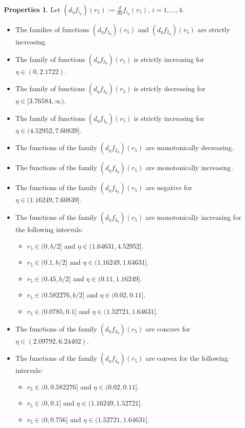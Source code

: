 \documentclass[final,11pt]{article}
\numberwithin{equation}{section}
\theoremstyle{definition}
\newtheorem{properties}[theorem]{Properties}
\begin{document}
\begin{properties}\label{dfs}
Let $\left(d_{\eta}f_{i_\eta}\right)(r_5):=\frac{d}{d\eta}f_{i_\eta}(r_5)$, $i=1,...,4$.
\begin{itemize}
\item The families of functions $\left(d_{\eta}f_{1_\eta}\right)(r_5)$ and $\left(d_{\eta}f_{2_\eta}\right)(r_5)$ are strictly increasing.
\item The family of functions $\left(d_{\eta}f_{3_\eta}\right)(r_5)$ is strictly increasing for $\eta\in(0,2.1722)$.
\item The family of functions $\left(d_{\eta}f_{3_\eta}\right)(r_5)$ is strictly decreasing for $\eta\in[3.76584,\infty)$.
\item The family of functions $\left(d_{\eta}f_{4_\eta}\right)(r_5)$ is strictly increasing for $\eta\in(4.52952,7.60839]$.
\item The functions of the family $\left(d_{\eta}f_{2_\eta}\right)(r_5)$ are monotonically decreasing.
\item The functions of the family $\left(d_{\eta}f_{3_\eta}\right)(r_5)$ are monotonically increasing\,. 
\item The functions of the family $\left(d_{\eta}f_{4_\eta}\right)(r_5)$ are negative for $\eta\in(1.16249,7.60839]$.
\item The functions of the family $\left(d_{\eta}f_{4_\eta}\right)(r_5)$ are monotonically increasing for the following intervals: 
\begin{itemize}
\item $r_{5}\in(0,b/2]$ and $\eta\in(1.64631,4.52952]$.
\item $r_{5}\in(0.1,b/2]$ and $\eta\in(1.16249,1.64631]$.
\item $r_{5}\in(0.45,b/2]$ and $\eta\in(0.11,1.16249]$.
\item $r_{5}\in(0.582276,b/2]$ and $\eta\in(0.02,0.11]$.
\item $r_{5}\in(0.0785,0.1]$ and $\eta\in(1.52721,1.64631]$.
\end{itemize}
\item The functions of the family $\left(d_{\eta}f_{4_\eta}\right)(r_5)$ are concave for $\eta\in(2.09792,6.24402)$.
\item The functions of the family $\left(d_{\eta}f_{4_\eta}\right)(r_5)$ are convex for the following intervals: 
\begin{itemize}
\item $r_{5}\in(0,0.582276]$ and $\eta\in(0.02,0.11]$.
\item $r_{5}\in(0,0.1]$ and $\eta\in(1.16249,1.52721]$.
\item $r_{5}\in(0,0.756]$ and $\eta\in(1.52721,1.64631]$.
\end{itemize}
\end{itemize}
\end{properties}
\end{document}
